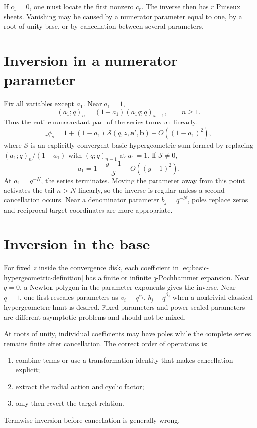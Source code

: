 \documentclass[11pt,letterpaper,oneside,openany]{book}
\theoremstyle{definition}
\theoremstyle{remark}
\begin{document}
If \(c_1=0\), one must locate the first nonzero \(c_r\).  The inverse then has
\(r\) Puiseux sheets.  Vanishing may be caused by a numerator parameter equal
to one, by a root-of-unity base, or by cancellation between several
parameters.

\section{Inversion in a numerator parameter}
Fix all variables except \(a_1\).  Near \(a_1=1\),
\[
 (a_1;q)_n=(1-a_1)(a_1q;q)_{n-1},\qquad n\ge1.
\]
Thus the entire nonconstant part of the series turns on linearly:
\begin{equation}\label{eq:hypergeometric-parameter-turnon}
 {}_r\phi_s=1+(1-a_1)\,
 \mathcal S(q,z,\bm a',\bm b)+O((1-a_1)^2),
\end{equation}
where \(\mathcal S\) is an explicitly convergent basic hypergeometric sum
formed by replacing \((a_1;q)_n/(1-a_1)\) with \((q;q)_{n-1}\) at
\(a_1=1\).  If \(\mathcal S\ne0\),
\[
 a_1=1-\frac{y-1}{\mathcal S}+O((y-1)^2).
\]
At \(a_1=q^{-N}\), the series terminates.  Moving the parameter away from this
point activates the tail \(n>N\) linearly, so the inverse is regular unless a
second cancellation occurs.  Near a denominator parameter
\(b_j=q^{-N}\), poles replace zeros and reciprocal target coordinates are
more appropriate.

\section{Inversion in the base}
For fixed \(z\) inside the convergence disk, each coefficient in
\eqref{eq:basic-hypergeometric-definition} has a finite or infinite
\(q\)-Pochhammer expansion.  Near \(q=0\), a Newton polygon in the parameter
exponents gives the inverse.  Near \(q=1\), one first rescales parameters as
\(a_i=q^{\alpha_i}\), \(b_j=q^{\beta_j}\) when a nontrivial classical
hypergeometric limit is desired.  Fixed parameters and power-scaled parameters
are different asymptotic problems and should not be mixed.

At roots of unity, individual coefficients may have poles while the complete
series remains finite after cancellation.  The correct order of operations is:
\begin{enumerate}[label=(\arabic*)]
\item combine terms or use a transformation identity that makes cancellation
explicit;
\item extract the radial action and cyclic factor;
\item only then revert the target relation.
\end{enumerate}
Termwise inversion before cancellation is generally wrong.
\end{document}
